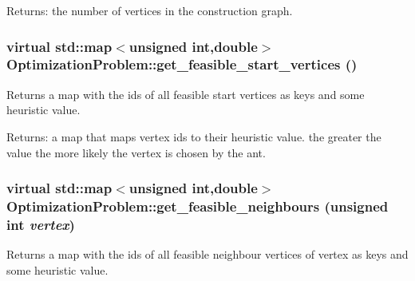 \begin{Desc}
\item[Returns:]the number of vertices in the construction graph. \end{Desc}
\hypertarget{classOptimizationProblem_9d90c97f690e8987a152b37d0c51e744}{
\subsubsection[get\_\-feasible\_\-start\_\-vertices]{\setlength{\rightskip}{0pt plus 5cm}virtual std::map$<$unsigned int,double$>$ OptimizationProblem::get\_\-feasible\_\-start\_\-vertices ()}}
\label{classOptimizationProblem_9d90c97f690e8987a152b37d0c51e744}


Returns a map with the ids of all feasible start vertices as keys and some heuristic value. 

\begin{Desc}
\item[Returns:]a map that maps vertex ids to their heuristic value. the greater the value the more likely the vertex is chosen by the ant. \end{Desc}
\hypertarget{classOptimizationProblem_582a4ef61a491e2741060c2f83c3fc2e}{
\subsubsection[get\_\-feasible\_\-neighbours]{\setlength{\rightskip}{0pt plus 5cm}virtual std::map$<$unsigned int,double$>$ OptimizationProblem::get\_\-feasible\_\-neighbours (unsigned int {\em vertex})}}
\label{classOptimizationProblem_582a4ef61a491e2741060c2f83c3fc2e}


Returns a map with the ids of all feasible neighbour vertices of vertex as keys and some heuristic value. 


